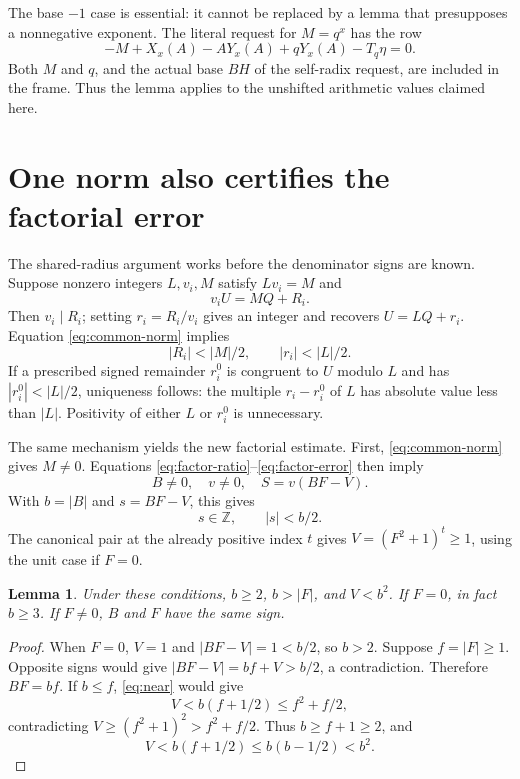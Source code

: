 \documentclass[11pt]{article}
\newtheorem{lemma}[theorem]{Lemma}
\theoremstyle{definition}\newtheorem{definition}[theorem]{Definition}
\begin{document}
The base \(-1\) case is essential: it cannot be replaced by a lemma
that presupposes a nonnegative exponent. The literal request for
\(M=q^x\) has the row
\[
 -M+X_x(A)-AY_x(A)+qY_x(A)-T_q\eta=0.
\]
Both \(M\) and \(q\), and the actual base \(BH\) of the self-radix
request, are included in the frame. Thus the lemma applies to the
unshifted arithmetic values claimed here.

\section{One norm also certifies the factorial error}

The shared-radius argument works before the denominator signs are known.
Suppose nonzero integers \(L,v_i,M\) satisfy \(Lv_i=M\) and
\[
 v_i U=M Q+R_i.
\]
Then \(v_i\mid R_i\); setting \(r_i=R_i/v_i\) gives an integer and
recovers \(U=LQ+r_i\). Equation \eqref{eq:common-norm} implies
\[
 |R_i|<|M|/2,\qquad |r_i|<|L|/2.
\]
If a prescribed signed remainder \(r_i^0\) is congruent to \(U\)
modulo \(L\) and has \(|r_i^0|<|L|/2\), uniqueness follows:
the multiple \(r_i-r_i^0\) of \(L\) has absolute value less than \(|L|\).
Positivity of either \(L\) or \(r_i^0\) is unnecessary.

The same mechanism yields the new factorial estimate.
First, \eqref{eq:common-norm} gives \(M\ne0\).
Equations \eqref{eq:factor-ratio}--\eqref{eq:factor-error} then imply
\[
 B\ne0,\quad v\ne0,\quad S=v(BF-V).
\]
With \(b=|B|\) and \(s=BF-V\), this gives
\begin{equation}\label{eq:near}
 s\in\mathbb Z,\qquad |s|<b/2.
\end{equation}
The canonical pair at the already positive index \(t\) gives
\(V=(F^2+1)^t\ge1\), using the unit case if \(F=0\).

\begin{lemma}\label{lem:early-bound}
Under these conditions, \(b\ge2\), \(b>|F|\), and \(V<b^2\).
If \(F=0\), in fact \(b\ge3\). If \(F\ne0\), \(B\) and \(F\)
have the same sign.
\end{lemma}

\begin{proof}
When \(F=0\), \(V=1\) and \(|BF-V|=1<b/2\), so \(b>2\).
Suppose \(f=|F|\ge1\). Opposite signs would give
\(|BF-V|=bf+V>b/2\), a contradiction. Therefore \(BF=bf\).
If \(b\le f\), \eqref{eq:near} would give
\[
 V<b(f+1/2)\le f^2+f/2,
\]
contradicting \(V\ge(f^2+1)^2>f^2+f/2\).
Thus \(b\ge f+1\ge2\), and
\[
 V<b(f+1/2)\le b(b-1/2)<b^2.
\]
\end{proof}
\end{document}
